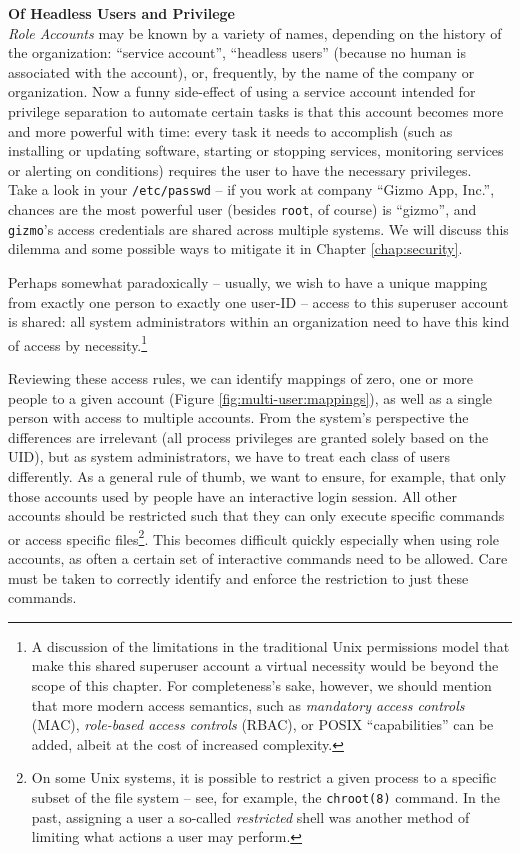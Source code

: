 \begin{sidenote}
{\bf Of Headless Users and Privilege} \\

{\em Role Accounts} may be known by a variety of
names, depending on the history of the organization:
``service account'', ``headless users'' (because no human is
associated with the account), or, frequently, by the
name of the company or organization.  Now a funny
side-effect of using a service account intended for
privilege separation to automate certain tasks is
that this account becomes more and more powerful with
time: every task it needs to accomplish (such as
installing or updating software, starting or stopping
services, monitoring services or alerting on
conditions) requires the user to have the necessary
privileges. \\ [10pt]

Take a look in your {\tt /etc/passwd} -- if you work
at company ``Gizmo App, Inc.'', chances are the most
powerful user (besides {\tt root}, of course) is
``gizmo'', and {\tt gizmo}'s access credentials are
shared across multiple systems.  We will discuss this
dilemma and some possible ways to mitigate it in
Chapter \ref{chap:security}.
\end{sidenote}


Perhaps somewhat paradoxically -- usually, we wish to
have a unique mapping from exactly one person to
exactly one user-ID -- access to this superuser
account is shared: all system administrators within an
organization need to have this kind of access by
necessity.\footnote{A discussion of the limitations in
the traditional Unix permissions model that make this
shared superuser account a virtual necessity would be
beyond the scope of this chapter.  For completeness's
sake, however, we should mention that more modern
access semantics, such as {\em mandatory access
controls} (MAC), {\em role-based access controls}
(RBAC), or POSIX ``capabilities''  can be added,
albeit at the cost of increased complexity.}

Reviewing these access rules, we can identify mappings
of zero, one or more people to a given account (Figure
\ref{fig:multi-user:mappings}), as well as a single
person with access to multiple accounts.  From the
system's perspective the differences are irrelevant
(all process privileges are granted solely based on
the UID), but as system administrators, we have to
treat each class of users differently.  As a general
rule of thumb, we want to ensure, for example, that
only those accounts used by people have an
interactive login session.  All other accounts should
be restricted such that they can only execute specific
commands or access specific files\footnote{On some
Unix systems, it is possible to restrict a given
process to a specific subset of the file system --
see, for example, the {\tt chroot(8)} command.  In the past, assigning a user a
so-called {\em restricted} shell was another method of
limiting what actions a user may perform.}.  This
becomes difficult quickly especially when using role
accounts, as often a certain set of interactive
commands need to be allowed.  Care must be taken to
correctly identify and enforce the restriction to
just these commands.

